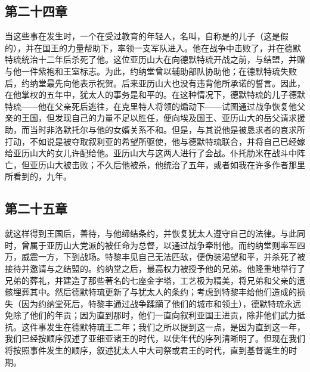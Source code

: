 
\subsection{第二十四章}

当这些事在发生时，一个在受过教育的年轻人，名叫，自称是的儿子（这是假的），并在国王的力量帮助下，率领一支军队进入。他在战争中击败了，并在德默特琉统治十二年后杀死了他。这位亚历山大在向德默特琉开战之前，与结盟，并赠与他一件紫袍和王室标志。为此，约纳堂曾以辅助部队协助他；在德默特琉失败后，约纳堂最先向他表示祝贺。后来亚历山大也没有违背他所承诺的誓言。因此，在他掌权的五年中，犹太人的事务是和平的。在这种情况下，德默特琉的儿子德默特琉——他在父亲死后逃往，在克里特人将领的煽动下——试图通过战争恢复他父亲的王国，但发现自己的力量不足以胜任，便向埃及国王、亚历山大的岳父请求援助，而当时非洛默托尔与他的女婿关系不和。但是，与其说他是被恳求者的哀求所打动，不如说是被夺取叙利亚的希望所驱使，他与德默特琉联合，并将自己已经嫁给亚历山大的女儿许配给他。亚历山大与这两人进行了会战。仆托肋米在战斗中阵亡，但亚历山大被击败；不久后他被杀，他统治了五年，或者如我在许多作者那里所看到的，九年。\par


\subsection{第二十五章}

就这样得到王国后，善待，与他缔结条约，并恢复犹太人遵守自己的法律。与此同时，曾属于亚历山大党派的被任命为总督，以通过战争牵制他。而约纳堂则率军四万，威震一方，下到战场。特黎丰见自己无法匹敌，便伪装渴望和平，并杀死了被接待并邀请与之结盟的。约纳堂之后，最高权力被授予他的兄弟。他隆重地举行了兄弟的葬礼，并建造了那些著名的七座金字塔，工艺极为精美，将兄弟和父亲的遗骸埋葬其中。然后德默特琉更新了与犹太人的条约；考虑到特黎丰给他们造成的损失（因为约纳堂死后，特黎丰通过战争蹂躏了他们的城市和领土），德默特琉永远免除了他们的年贡；因为直到那时，他们一直向叙利亚国王进贡，除非他们武力抵抗。这件事发生在德默特琉王二年；我们之所以提到这一点，是因为直到这一年，我们已经按顺序叙述了亚细亚诸王的时代，以使年代的序列清晰明了。但现在我们将按照事件发生的顺序，叙述犹太人中大司祭或君王的时代，直到基督诞生的时期。\par

